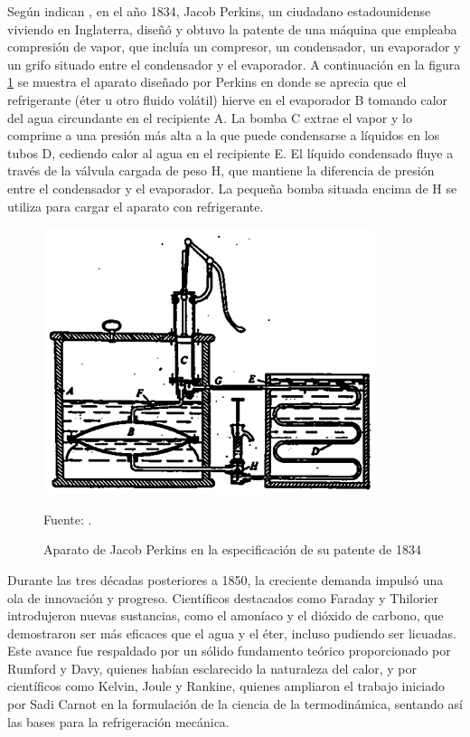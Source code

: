 Según indican \cite{critchell1912}, en el año 1834, Jacob Perkins, un ciudadano estadounidense viviendo en Inglaterra, diseñó y obtuvo la patente de una máquina que empleaba compresión de vapor, que incluía un compresor, un condensador, un evaporador y un grifo situado entre el condensador y el evaporador. A continuación en la figura \ref{fig:aparato-jacob} se muestra el aparato diseñado por Perkins en donde se aprecia que el refrigerante (éter u otro fluido volátil) hierve en el evaporador B tomando calor del agua circundante en el recipiente A. La bomba C extrae el vapor y lo comprime a una presión más alta a la que puede condensarse a líquidos en los tubos D, cediendo calor al agua en el recipiente E. El líquido condensado fluye a través de la válvula cargada de peso H, que mantiene la diferencia de presión entre el condensador y el evaporador. La pequeña bomba situada encima de H se utiliza para cargar el aparato con refrigerante.

\begin{figure}[H]
	\centering
	\includegraphics[width=0.6\linewidth]{figures/aparato-jacob}
	\caption{Aparato de Jacob Perkins en la especificación de su patente de 1834}
	Fuente: \cite{vidyaputra}.
	\label{fig:aparato-jacob}
\end{figure}

 
Durante las tres décadas posteriores a 1850, la creciente demanda impulsó una ola de innovación y progreso. Científicos destacados como Faraday y Thilorier introdujeron nuevas sustancias, como el amoníaco y el dióxido de carbono, que demostraron ser más eficaces que el agua y el éter, incluso pudiendo ser licuadas. Este avance fue respaldado por un sólido fundamento teórico proporcionado por Rumford y Davy, quienes habían esclarecido la naturaleza del calor, y por científicos como Kelvin, Joule y Rankine, quienes ampliaron el trabajo iniciado por Sadi Carnot en la formulación de la ciencia de la termodinámica, sentando así las bases para la refrigeración mecánica.

